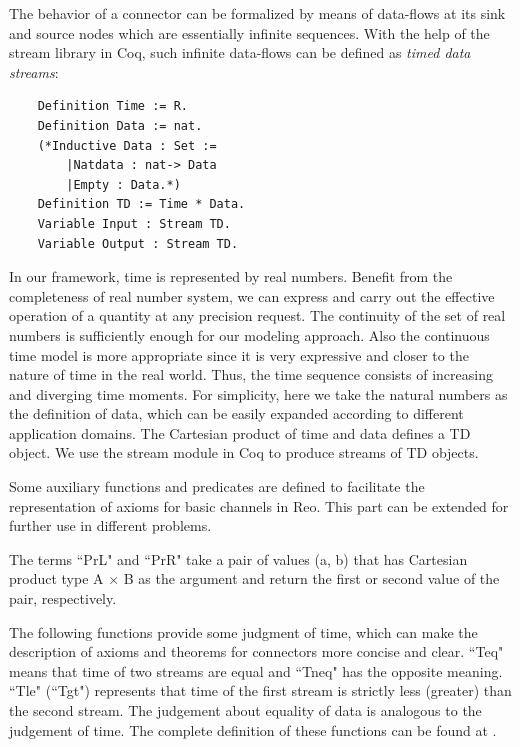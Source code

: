 \documentclass[3p,times]{elsarticle}
\begin{document}
The behavior of a connector can be formalized by means of data-flows at its sink and source nodes which are essentially infinite sequences. With the help of the stream library in Coq, such infinite data-flows can be defined as \emph{timed data streams}:
\begin{verbatim}
    Definition Time := R.
    Definition Data := nat.
    (*Inductive Data : Set :=
        |Natdata : nat-> Data
        |Empty : Data.*)
    Definition TD := Time * Data.
    Variable Input : Stream TD.
    Variable Output : Stream TD.
\end{verbatim}
%
In our framework, time is represented by real numbers. Benefit from the completeness of real number system, we can express and carry out the effective operation of a quantity at any precision request.
The continuity of the set of real numbers is sufficiently enough for our modeling approach. Also the
continuous time model is more appropriate since it is very expressive and closer to the nature of time in the real world. Thus, the time sequence consists of increasing and diverging time moments. For simplicity, here we take the natural numbers as the definition of data, which can be easily expanded according to different application domains. The Cartesian product of time and data defines a TD object.
We use the stream module in Coq to produce streams of TD objects.

Some auxiliary functions and predicates are defined to facilitate the representation of axioms for basic channels in Reo. This part can be extended for further use in different problems.

The terms ``PrL" and ``PrR" take a pair of values (a, b) that has Cartesian product type A $\times$ B as the argument and return the first or second value of the pair, respectively.

The following functions provide some judgment of time, which can make
the description of axioms and theorems for connectors more concise and
clear. ``Teq" means that time of two streams are equal and ``Tneq" has the
opposite meaning. ``Tle"  (``Tgt") represents that time of the first stream is
strictly less (greater) than the second stream. The judgement about
equality of data is analogous to the judgement of time. The complete
definition of these functions can be found at \cite{reo2coqfile}.
\end{document}
